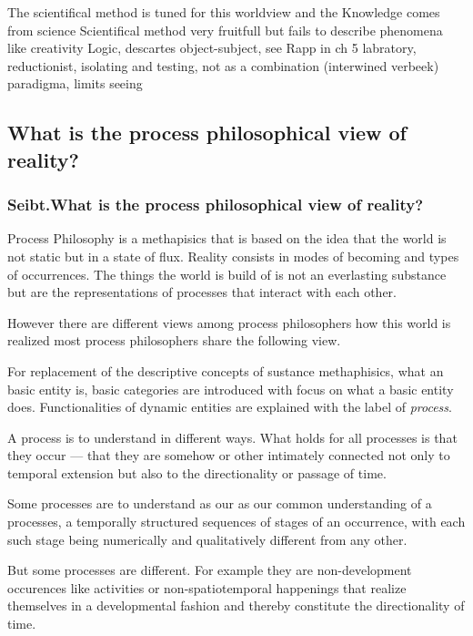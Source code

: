 The scientifical method is tuned for this worldview and the 
Knowledge comes from science
Scientifical method very fruitfull but fails to describe phenomena like creativity
Logic, descartes object-subject, see Rapp in ch 5
\cite[chapter 5]{rapp1990whitehad}
labratory, reductionist, isolating and testing, not as a combination (interwined verbeek)
paradigma, limits seeing
\cite[ch 5]{rapp1990whitehad}


\subsection{What is the process philosophical view of reality?}
\subsubsection{Seibt.What is the process philosophical view of reality?}
Process Philosophy is a methapisics that is based on the idea that the world is not static but in a state of flux. Reality consists in modes of becoming and types of occurrences. 
The things the world is build of is not an everlasting substance but are the representations of processes that interact with each other.  

However there are different views among process philosophers how this world is realized  most process philosophers share the following view.

For replacement of the descriptive concepts of sustance methaphisics, what an basic entity is, basic categories are introduced with focus on what a basic entity does.
Functionalities of dynamic entities are explained with the label of \textit{process}. 

A process is to understand in different ways. 
What holds for all processes is that they occur — that they are somehow or other intimately connected not only to temporal extension but also to the directionality or passage of time.

Some processes are to understand as our as our common understanding of a processes, a temporally structured sequences of stages of an occurrence, with each such stage being numerically and qualitatively different from any other. 

But some processes are different. For example they are non-development occurences like activities or non-spatiotemporal happenings that realize themselves in a developmental fashion and thereby constitute the directionality of time. 

